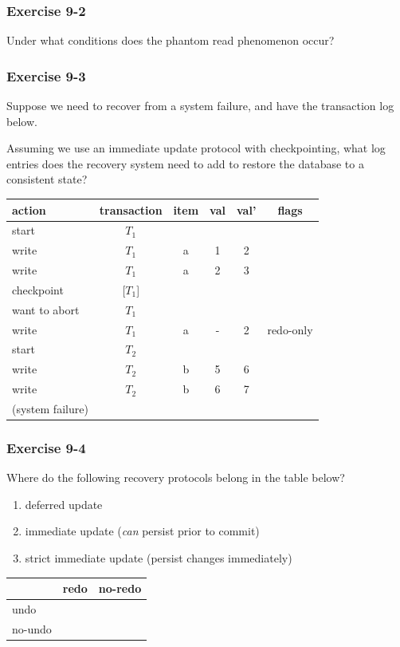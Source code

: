 \begin{frame}
\frametitle{Exercise 9-2}

Under what conditions does the phantom read phenomenon occur?

\end{frame}


\begin{frame}
\frametitle{Exercise 9-3}

Suppose we need to recover from a system failure, and have the transaction log below.

Assuming we use an immediate update protocol with checkpointing, what log entries does the recovery system need to add to restore the database to a consistent state?

\begin{center}
\begin{tabular}{ | l | c c c c | c | }
  \hline
  action & transaction & item & val & val' & flags \\
  \hline
  start & $T_1$ &   &   &   &           \\
  write & $T_1$ & a & 1 & 2 &           \\
  write & $T_1$ & a & 2 & 3 &           \\
  checkpoint & [$T_1$] &   &   &   &           \\
  want to abort & $T_1$ &   &   &   &           \\
  write & $T_1$ & a & - & 2 & redo-only \\
  start & $T_2$ &   &   &   &           \\
  write & $T_2$ & b & 5 & 6 &           \\
  write & $T_2$ & b & 6 & 7 &           \\
  (system failure) &       &   &   &   &           \\
  \hline
\end{tabular}
\end{center}

\end{frame}


\begin{frame}
\frametitle{Exercise 9-4}

Where do the following recovery protocols belong in the table below?

\begin{enumerate}
  \item deferred update
  \item immediate update (\textit{can} persist prior to commit)
  \item strict immediate update (persist changes immediately)
\end{enumerate}

\begin{center}
\begin{tabular}{ | l | c | c | }
  \hline
          & redo & no-redo \\
  \hline
  undo    &      &         \\
  \hline
  no-undo &      &         \\
  \hline
\end{tabular}
\end{center}

\end{frame}


